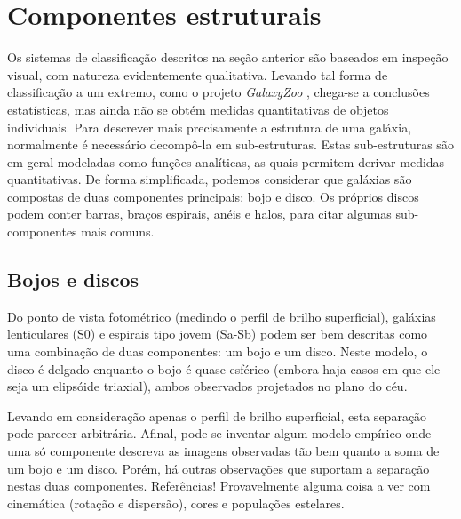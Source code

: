 
\section{Componentes estruturais}

Os sistemas de classificação descritos na seção anterior são baseados em
inspeção visual, com natureza evidentemente qualitativa. Levando tal forma de
classificação a um extremo, como o projeto {\em GalaxyZoo} \citep{Lintott2008,
Willett2013}, chega-se a conclusões estatísticas, mas ainda não se obtém medidas
quantitativas de objetos individuais. Para descrever mais precisamente a
estrutura de uma galáxia, normalmente é necessário decompô-la em sub-estruturas.
Estas sub-estruturas são em geral modeladas como funções analíticas, as quais
permitem derivar medidas quantitativas. De forma simplificada, podemos
considerar que galáxias são compostas de duas componentes principais: bojo e
disco. Os próprios discos podem conter barras, braços espirais, anéis e halos,
para citar algumas sub-componentes mais comuns.


\subsection{Bojos e discos}
\label{sec:morph:comp:bd}

Do ponto de vista fotométrico (medindo o perfil de brilho superficial), galáxias
lenticulares (S0) e espirais tipo jovem (Sa-Sb) podem ser bem descritas como uma
combinação de duas componentes: um bojo e um disco. Neste modelo, o disco é
delgado enquanto o bojo é quase esférico (embora haja casos em que ele seja um
elipsóide triaxial), ambos observados projetados no plano do céu.

Levando em consideração apenas o perfil de brilho superficial, esta separação
pode parecer arbitrária. Afinal, pode-se inventar algum modelo empírico onde uma
só componente descreva as imagens observadas tão bem quanto a soma de um bojo e
um disco. Porém, há outras observações que suportam a separação nestas duas
componentes. \TODO Referências! Provavelmente alguma coisa a ver com cinemática
(rotação e dispersão), cores e populações estelares.

